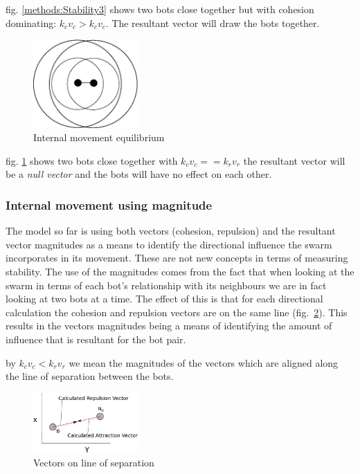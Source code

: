 \documentclass[10pt,journal,letterpaper,twoside]{IEEEtran}
\newcommand{\Stability}{Internal movement}
\newcommand{\Fig}{fig.}
\begin{document}
\Fig{} \ref{methods:Stability3} shows two bots close together but with cohesion dominating: $k_cv_c > k_cv_c$. The resultant vector will draw the bots together.

\begin{figure}[H]
\begin{center}
\includegraphics[width=4cm]{figures/Stability4}
\end{center}
\caption{\Stability{} equilibrium} \label{methods:Stability4}
\end{figure}

\Fig{} \ref{methods:Stability4} shows two bots close together with $k_cv_c == k_rv_r$ the resultant vector will be a \textit{null vector} and the bots will have no effect on each other.

\subsubsection{\Stability{} using magnitude}\label{Section:StabilityMagnatude}

The model so far is using both vectors (cohesion, repulsion) and the resultant vector magnitudes as a means to identify the directional influence the swarm incorporates in its movement. These are not new concepts in terms of measuring stability. The use of the magnitudes comes from the fact that when looking at the swarm in terms of each bot's relationship with its neighbours we are in fact looking at two bots at a time. The effect of this is that for each directional calculation the cohesion and repulsion vectors are on the same line (\Fig{}~\ref{methods:Stability5}). This results in the vectors magnitudes being a means of identifying the amount of influence that is resultant for the bot pair.

by $k_cv_c < k_rv_r$ we mean the magnitudes of the vectors which are aligned along the line of separation between the bots.

\begin{figure}[H]
\begin{center}
\includegraphics[width=4cm]{figures/Stability5}
\end{center}
\caption{Vectors on line of separation} \label{methods:Stability5}
\end{figure}
\end{document}
